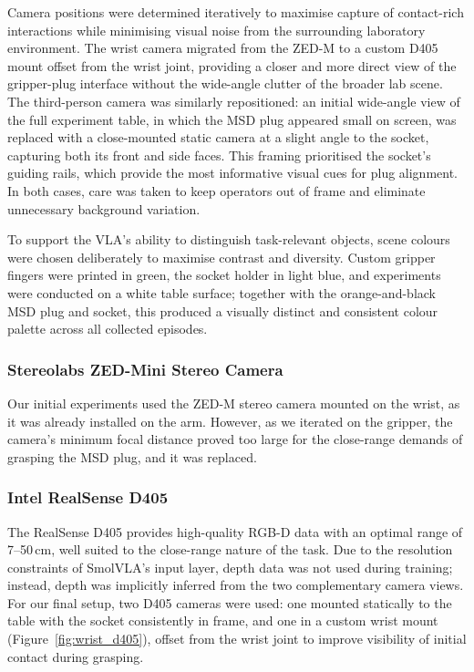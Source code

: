 \documentclass[conference]{IEEEtran}
\begin{document}
Camera positions were determined iteratively to maximise capture of contact-rich interactions while minimising visual noise from the surrounding laboratory environment. The wrist camera migrated from the ZED-M to a custom D405 mount offset from the wrist joint, providing a closer and more direct view of the gripper-plug interface without the wide-angle clutter of the broader lab scene. The third-person camera was similarly repositioned: an initial wide-angle view of the full experiment table, in which the MSD plug appeared small on screen, was replaced with a close-mounted static camera at a slight angle to the socket, capturing both its front and side faces. This framing prioritised the socket's guiding rails, which provide the most informative visual cues for plug alignment. In both cases, care was taken to keep operators out of frame and eliminate unnecessary background variation.

To support the VLA's ability to distinguish task-relevant objects, scene colours were chosen deliberately to maximise contrast and diversity. Custom gripper fingers were printed in green, the socket holder in light blue, and experiments were conducted on a white table surface; together with the orange-and-black MSD plug and socket, this produced a visually distinct and consistent colour palette across all collected episodes.

\subsubsection{Stereolabs ZED-Mini Stereo Camera}

Our initial experiments used the ZED-M stereo camera mounted on the wrist, as it was already installed on the arm. However, as we iterated on the gripper, the camera's minimum focal distance proved too large for the close-range demands of grasping the MSD plug, and it was replaced.

\subsubsection{Intel RealSense D405}

The RealSense D405 provides high-quality RGB-D data with an optimal range of 7--50\,cm, well suited to the close-range nature of the task. Due to the resolution constraints of SmolVLA's input layer, depth data was not used during training; instead, depth was implicitly inferred from the two complementary camera views. For our final setup, two D405 cameras were used: one mounted statically to the table with the socket consistently in frame, and one in a custom wrist mount (Figure~\ref{fig:wrist_d405}), offset from the wrist joint to improve visibility of initial contact during grasping.
\end{document}
